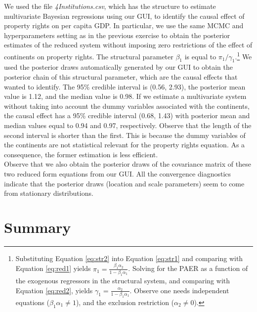 We used the file \textit{4Institutions.csv}, which has the structure to estimate multivariate Bayesian regressions using our GUI, to identify the causal effect of property rights on per capita GDP.
In particular, we use the same MCMC and hyperparameters setting as in the previous exercise to obtain the posterior estimates of the reduced system without imposing zero restrictions of the effect of continents on property rights.
The structural parameter $\beta_1$ is equal to $\pi_1/\gamma_1$.\footnote{Substituting Equation \ref{eq:str2} into Equation \ref{eq:str1} and comparing with Equation \ref{eq:red1} yields $\pi_1=\frac{\beta_1\alpha_2}{1-\beta_1\alpha_1}$.
	Solving for the PAER as a function of the exogenous regressors in the structural system, and comparing with Equation \ref{eq:red2}, yields $\gamma_1=\frac{\alpha_2}{1-\beta_1\alpha_1}$.
	Observe one needs independent equations ($\beta_1\alpha_1\neq 1$), and the exclusion restriction ($\alpha_2\neq 0$).} We used the posterior draws automatically generated by our GUI to obtain the posterior chain of this structural parameter, which are the causal effects  that \cite{Acemoglu2001} wanted to identify.
The 95\% credible interval is (0.56, 2.93), the posterior mean value is 1.12, and the median value is 0.98.
If we estimate a multivariate system without taking into account the dummy variables associated with the continents, the causal effect has a 95\% credible interval (0.68, 1.43) with posterior mean and median values equal to 0.94 and 0.97, respectively.
Observe that the length of the second interval is shorter than the first.
This is because the dummy variables of the continents are not statistical relevant for the property rights equation. As a consequence, the former estimation is less efficient.\\

Observe that we also obtain the posterior draws of the covariance matrix of these two reduced form equations from our GUI.
All the convergence diagnostics indicate that the posterior draws (location and scale parameters) seem to come from stationary distributions.\\

\section{Summary}\label{sec75}


